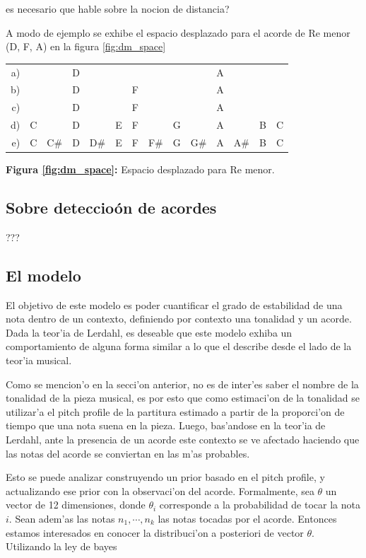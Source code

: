 \alert{es necesario que hable sobre la nocion de distancia?}

A modo de ejemplo se exhibe el espacio desplazado para el acorde de Re menor (D, F, A) en la figura \ref{fig:dm_space}

\begin{center}
\begin{tabular}{r c c c c c c c c c c c c c} 
\label{fig:dm_space}
a) &   &     & D &     &   &   &     &   &     & A &     &   &  \\
b) &   &     & D &     &   & F &     &   &     & A &     &   &  \\
c) &   &     & D &     &   & F &     &   &     & A &     &   &  \\
d) & C &     & D &     & E & F &     & G &     & A &     & B & C\\
e) & C & C\# & D & D\# & E & F & F\# & G & G\# & A & A\# & B & C\\
\end{tabular}
\newline
\textbf{Figura \ref{fig:dm_space}:} Espacio desplazado para Re menor.
\end{center}

\subsection{Sobre deteccio\'on de acordes}
???
\subsection{El modelo}
El objetivo de este modelo es poder cuantificar el grado de estabilidad de una nota dentro de un contexto, definiendo por contexto una tonalidad y un acorde. 
Dada la teor'ia de Lerdahl, es deseable que este modelo exhiba un comportamiento de alguna forma similar a lo que el describe desde el lado de la teor'ia musical. 

Como se mencion'o en la secci'on anterior, no es de inter'es saber el nombre de la tonalidad de la pieza musical, es por esto que como estimaci'on de la 
tonalidad se utilizar'a el pitch profile de la partitura estimado a partir de la proporci'on de tiempo que una nota suena en la pieza. Luego, bas'andose en 
la teor'ia de Lerdahl, ante la presencia de un acorde este contexto se ve afectado haciendo que las notas del acorde se conviertan en las m'as probables.  

Esto se puede analizar construyendo un prior basado en el pitch profile, y actualizando ese prior con la observaci'on del acorde. 
Formalmente, sea $\theta$ un vector de 12 dimensiones, donde $\theta_i$ corresponde a la probabilidad de tocar la nota $i$. Sean adem'as las notas $n_1, \cdots, n_k$ las notas 
tocadas por el acorde. Entonces estamos interesados en conocer la distribuci'on a posteriori de vector $\theta$. Utilizando la ley de bayes

